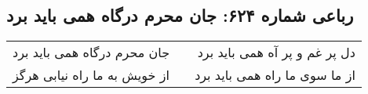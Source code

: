 \begin{center}
\section*{رباعی شماره ۶۲۴: جان محرم درگاه همی باید برد}
\label{sec:0624}
\begin{longtable}{l p{0.5cm} r}
جان محرم درگاه همی باید برد
&&
دل پر غم و پر آه همی باید برد
\\
از خویش به ما راه نیابی هرگز
&&
از ما سوی ما راه همی باید برد
\\
\end{longtable}
\end{center}
